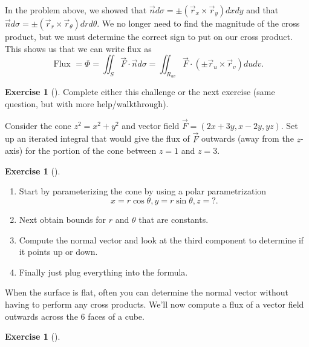 \documentclass[10pt,]{book}
\theoremstyle{plain}
\theoremstyle{definition}
\theoremstyle{definition}
\theoremstyle{definition}
\theoremstyle{definition}
\newtheorem{exploration}[project]{Exercise}
\theoremstyle{definition}
\numberwithin{equation}{section}
\begin{document}
In the problem above, we showed that \(\vec n d\sigma = \pm(\vec r_x\times\vec r_y)dxdy\) and that \(\vec n d\sigma = \pm(\vec r_r\times\vec r_\theta)drd\theta\). We no longer need to find the magnitude of the cross product, but we must determine the correct sign to put on our cross product. This shows us that we can write flux as%
\begin{equation*}
\text{ Flux } =\Phi 
= \iint_S \vec F\cdot \vec n d\sigma 
= \iint_{R_{uv}} \vec F\cdot (\pm \vec r_u\times \vec r_v) dudv
.
\end{equation*}
%
\begin{exploration}[]\label{exploration-283}
Complete either this challenge or the next exercise (same question, but with more help/walkthrough).%
\par
Consider the cone \(z^2=x^2+y^2\) and vector field \(\vec F = (2x+3y, x-2y, yz)\). Set up an iterated integral that would give the flux of \(\vec F\) outwards (away from the \(z\)-axis) for the portion of the cone between \(z=1\) and \(z=3\).%
\end{exploration}
\begin{exploration}[]\label{exploration-284}
\leavevmode%
\begin{enumerate}[font=\bfseries,label=(\alph*),ref=\alph*]
\item\label{task-772} Start by  parameterizing the cone by using a polar parametrization%
\begin{equation*}
x=r\cos\theta, y=r\sin\theta, z=?.
\end{equation*}
%
\item\label{task-773} Next obtain bounds for \(r\) and \(\theta\) that are constants.%
\item\label{task-774} Compute the normal vector and look at the third component to determine if it points up or down.%
\item\label{task-775} Finally just plug everything into the formula.%
\end{enumerate}
\end{exploration}
When the surface is flat, often you can determine the normal vector without having to perform any cross products. We'll now compute a flux of a vector field outwards across the 6 faces of a cube.%
\begin{exploration}[]\label{boxflux}
\end{exploration}
\typeout{************************************************}
\typeout{************************************************}
\end{document}
